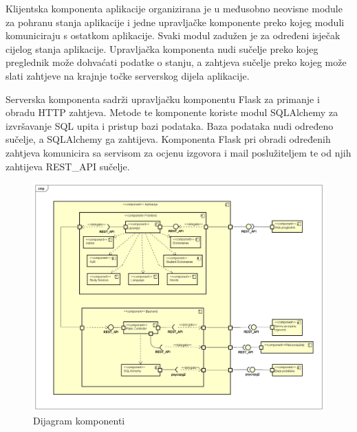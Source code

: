 Klijentska komponenta aplikacije organizirana je u međusobno neovisne module za pohranu stanja aplikacije i jedne upravljačke komponente preko kojeg moduli komuniciraju s ostatkom aplikacije. Svaki modul zadužen je za određeni isječak cijelog stanja aplikacije. Upravljačka komponenta nudi sučelje preko kojeg preglednik može dohvaćati podatke o stanju, a zahtjeva sučelje preko kojeg može slati zahtjeve na krajnje točke serverskog dijela aplikacije. 

Serverska komponenta sadrži upravljačku komponentu Flask za primanje i obradu HTTP zahtjeva. Metode te komponente koriste modul SQLAlchemy za izvršavanje SQL upita i pristup bazi podataka. Baza podataka nudi određeno sučelje, a SQLAlchemy ga zahtijeva. Komponenta Flask pri obradi određenih zahtjeva komunicira sa servisom za ocjenu izgovora i mail poslužiteljem te od njih zahtijeva REST\_API sučelje.


\begin{figure}[htp]
\includegraphics[scale=0.35]{dijagrami/ComponentDiagram0.png}
\centering
\caption{Dijagram komponenti}
\label{fig:komponente}
\end{figure}